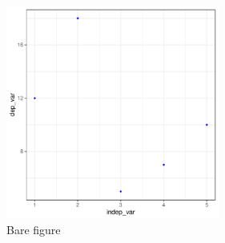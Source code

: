 \documentclass[12pt, a4paper]{scrartcl}
\begin{document}
\begin{figure}
\centering
\includegraphics[width=7cm]{../../../04_analyze/scatter_regress/figure/figure.pdf}

\label{fig:img1}
\caption{Bare figure}
\end{figure}



\end{document}
